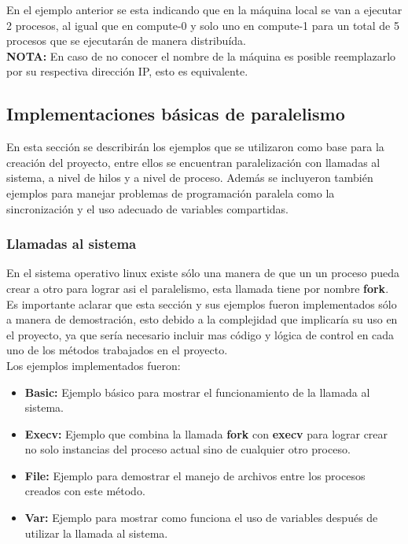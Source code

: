 \documentclass{article}
\begin{document}


\vspace{0.5cm}

En el ejemplo anterior se esta indicando que en la máquina
local se van a ejecutar 2 procesos, al igual que en compute-0
y solo uno en compute-1 para un total de 5 procesos que se
ejecutarán de manera distribuída.\\

\textbf{NOTA:} En caso de no conocer el nombre de la máquina
es posible reemplazarlo por su respectiva dirección IP, esto es
equivalente.

\subsection{Implementaciones básicas de paralelismo}

En esta sección se describirán los ejemplos que se utilizaron como
base para la creación del proyecto, entre ellos se encuentran
paralelización con llamadas al sistema, a nivel de hilos y a nivel
de proceso. Además se incluyeron también ejemplos para manejar
problemas de programación paralela como la sincronización y el uso
adecuado de variables compartidas.

\subsubsection{Llamadas al sistema}

En el sistema operativo linux existe sólo una manera de que un
un proceso pueda crear a otro para lograr asi el paralelismo,
esta llamada tiene por nombre \textbf{fork}. Es importante aclarar
que esta sección y sus ejemplos fueron implementados sólo a
manera de demostración, esto debido a la complejidad que
implicaría su uso en el proyecto, ya que sería necesario incluir
mas código y lógica de control en cada uno de los métodos
trabajados en el proyecto.\\

Los ejemplos implementados fueron:

\begin{itemize}
    \item \textbf{Basic:} Ejemplo básico para mostrar el
        funcionamiento de la llamada al sistema.

    \item \textbf{Execv:} Ejemplo que combina la llamada
        \textbf{fork} con \textbf{execv} para lograr crear
        no solo instancias del proceso actual sino de cualquier
        otro proceso.

    \item \textbf{File:} Ejemplo para demostrar el manejo de
        archivos entre los procesos creados con este método.

    \item \textbf{Var:} Ejemplo para mostrar como funciona el
        uso de variables después de utilizar la llamada
        al sistema.
\end{itemize}
\end{document}
